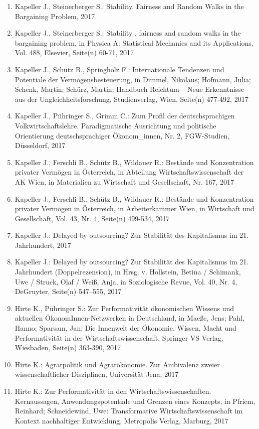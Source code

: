 \begin{enumerate}
	 \item Kapeller J., Steinerberger S.: Stability, Fairness and Random Walks in the Bargaining Problem, 2017
	 \item Kapeller J., Steinerberger S.: Stability , fairness and random walks in the bargaining problem, in Physica A: Statistical Mechanics and its Applications, Vol. 488, Elsevier, Seite(n) 60-71, 2017
	 \item Kapeller J., Schütz B., Springholz F.: Internationale Tendenzen und Potentiale der Vermögensbesteuerung, in Dimmel, Nikolaus; Hofmann, Julia; Schenk, Martin; Schürz, Martin: Handbuch Reichtum – Neue Erkenntnisse aus der Ungleichheitsforschung, Studienverlag, Wien, Seite(n) 477-492, 2017
	 \item Kapeller J., Pühringer S., Grimm C.: Zum Profil der deutschsprachigen Volkwirtschaftslehre. Paradigmatische Ausrichtung und politische Orientierung deutschsprachiger Ökonom\_innen, Nr. 2, FGW-Studien, Düsseldorf, 2017
	 \item Kapeller J., Ferschli B., Schütz B., Wildauer R.: Bestände und Konzentration privater Vermögen in Österreich, in Abteilung Wirtschaftswissenschaft der AK Wien, in Materialien zu Wirtschaft und Gesellschaft, Nr. 167, 2017
	 \item Kapeller J., Ferschli B., Schütz B., Wildauer R.: Bestände und Konzentration privater Vermögen in Österreich, in Arbeiterkammer Wien, in Wirtschaft und Gesellschaft, Vol. 43, Nr. 4, Seite(n) 499-534, 2017
	 \item Kapeller J.: Delayed by outsourcing? Zur Stabilität des Kapitalismus im 21. Jahrhundert, 2017
	 \item Kapeller J.: Delayed by outsourcing? Zur Stabilität des Kapitalismus im 21. Jahrhundert (Doppelrezension), in Hrsg. v. Hollstein, Betina / Schimank, Uwe / Struck, Olaf / Weiß, Anja, in Soziologische Revue, Vol. 40, Nr. 4, DeGruyter, Seite(n) 547–555, 2017
	 \item Hirte K., Pühringer S.: Zur Performativität ökonomischen Wissens und aktuellen ÖkonomInnen-Netzwerken in Deutschland, in Maeße, Jens; Pahl, Hanno; Sparsam, Jan: Die Innenwelt der Ökonomie. Wissen, Macht und Performativität in der Wirtschaftswissenschaft, Springer VS Verlag, Wiesbaden, Seite(n) 363-390, 2017
	 \item Hirte K.: Agrarpolitik und Agrarökonomie. Zur Ambivalenz zweier wissenschaftlicher Disziplinen, Universität Jena, 2017
	 \item Hirte K.: Zur Performativität in den Wirtschaftswissenschaften. Kernaussagen, Anwendungspotentiale und Grenzen eines Konzepts, in Pfriem, Reinhard; Schneidewind, Uwe: Transformative Wirtschaftswissenschaft im Kontext nachhaltiger Entwicklung, Metropolis Verlag, Marburg, 2017

\end{enumerate}
